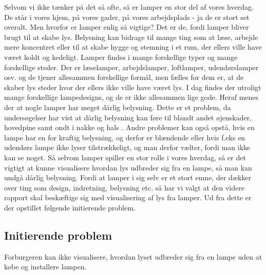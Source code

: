 Selvom vi ikke tænker på det så ofte, så er lamper en stor del af vores hverdag. De står i vores hjem, på vores gader, på vores arbejdsplads - ja de er stort set overalt. Men hvorfor er lamper enlig så vigtige? Det er de, fordi lamper bliver brugt til at skabe lys. Belysning kan bidrage til mange ting som at læse, arbejde mere koncentret eller til at skabe hygge og stemning i et rum, der ellers ville have været koldt og kedeligt. Lamper findes i mange forskellige typer og mange forskellige steder. Der er læselamper, arbejdslamper, loftlamper, udendørslamper osv. og de tjener allesammen forskellige formål, men fælles for dem er, at de skaber lys steder hvor der ellers ikke ville have været lys. 
I dag findes der utroligt mange forskellige lampedesigns, og de er ikke allesammen lige gode. Heraf menes der at nogle lamper har meget dårlig belysning. Dette er et problem, da undersøgelser har vist at dårlig belysning kan føre til blandt andet øjenskader, hovedpine samt ondt i nakke og hals \cite{lys_konsekvenser}. Andre problemer kan også opstå, hvis en lampe har en for kraftig belysning, og derfor er blændende eller hvis f.eks en udendørs lampe ikke lyser tilstrækkeligt, og man derfor vælter, fordi man ikke kan se noget. 
Så selvom lamper spiller en stor rolle i vores hverdag, så er det vigtigt at kunne visualisere hvordan lys udbreder sig fra en lampe, så man kan undgå dårlig belysning. 
Fordi at lamper i sig selv er et stort emne, der dækker over ting som design, indretning, belysning etc. så har vi valgt at den videre rapport skal beskæftige sig med visualisering af lys fra lamper. Ud fra dette er der opstillet følgende initierende problem.

\subsection{Initierende problem}

Forburgeren kan ikke visualisere, hvordan lyset udbreder sig fra en lampe uden at købe og installere lampen.